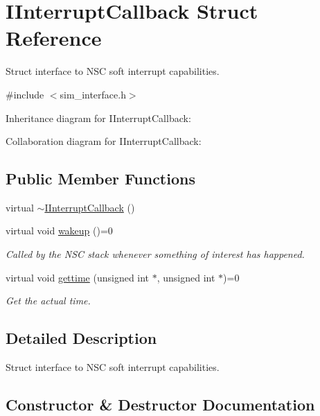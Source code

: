 \hypertarget{structIInterruptCallback}{}\section{I\+Interrupt\+Callback Struct Reference}
\label{structIInterruptCallback}


Struct interface to N\+SC soft interrupt capabilities.  




{\ttfamily \#include $<$sim\+\_\+interface.\+h$>$}



Inheritance diagram for I\+Interrupt\+Callback\+:


Collaboration diagram for I\+Interrupt\+Callback\+:
\subsection*{Public Member Functions}
\begin{DoxyCompactItemize}
\item 
virtual \hyperlink{structIInterruptCallback_aede2ccbba3400d3a3d8b8b4f4a5b577f}{$\sim$\+I\+Interrupt\+Callback} ()
\item 
virtual void \hyperlink{structIInterruptCallback_a2c7085fd20909a27661a12a7d5609e99}{wakeup} ()=0
\begin{DoxyCompactList}\small\item\em Called by the N\+SC stack whenever something of interest has happened. \end{DoxyCompactList}\item 
virtual void \hyperlink{structIInterruptCallback_ac4adb33124456e43d49b7c6cbc803fb4}{gettime} (unsigned int $\ast$, unsigned int $\ast$)=0
\begin{DoxyCompactList}\small\item\em Get the actual time. \end{DoxyCompactList}\end{DoxyCompactItemize}


\subsection{Detailed Description}
Struct interface to N\+SC soft interrupt capabilities. 

\subsection{Constructor \& Destructor Documentation}

